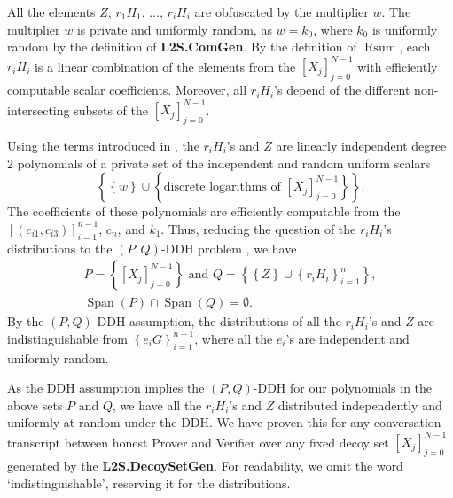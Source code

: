 \documentclass{mathcryptology} %
\DeclareMathOperator{\Rsum}{Rsum}
\DeclareMathOperator{\Span}{Span}
\theoremstyle{title}
\theoremstyle{titleof}
\begin{document}
    All the elements $Z$, $r_{1}H_{1}$, $\dots$, $r_{i}H_{i}$ are obfuscated by the multiplier $w$. The multiplier $w$ is private and uniformly random, as $w=k_{0}$, where $k_{0}$ is uniformly random by the definition of \textbf{L2S.ComGen}. By the definition of $\Rsum$, each $r_{i}H_{i}$ is a linear combination of the elements from the ${\left[X_{j}\right]}_{j=0}^{N-1}$ with efficiently computable scalar coefficients. Moreover, all $r_{i}H_{i}$'s depend of the different non-intersecting subsets of the ${\left[X_{j}\right]}_{j=0}^{N-1}$.

    Using the terms introduced in \cite{4}, the $r_{i}H_{i}$'s and $Z$ are linearly independent degree 2 polynomials of a private set of the independent and random uniform scalars
    \begin{equation*}
        \left\{\left\{w\right\} \cup \left\{\text{discrete logarithms of ${\left[X_{j}\right]}_{j=0}^{N-1}$} \right\}\right\}.
    \end{equation*}
    The coefficients of these polynomials are efficiently computable from the ${\left[\left(c_{i1}, c_{i3}\right)\right]}_{i=1}^{n-1}$, $c_{n}$, and $k_{1}$. Thus, reducing the question of the $r_{i}H_{i}$'s distributions to the $\left(P,Q\right)$-DDH problem \cite{4}, we have
    \begin{gather*}
        P = \left\{ {\left[X_{j}\right]}_{j=0}^{N-1} \right\} \text{ and }
        Q = \left\{\left\{Z\right\} \cup {\left\{r_{i}H_{i}\right\}}_{i=1}^n \right\},\\
        \Span\left(P\right) \cap \Span\left(Q\right)= \emptyset.
    \end{gather*}
    By the $\left(P,Q\right)$-DDH assumption, the distributions of all the $r_{i}H_{i}$'s and $Z$ are indistinguishable from ${\left\{e_{i} G\right\}}_{i=1}^{n+1}$, where all the $e_{i}$'s are independent and uniformly random.

    As the DDH assumption implies the $\left(P,Q\right)$-DDH \cite{4} for our polynomials in the above sets $P$ and $Q$, we have all the $r_{i}H_{i}$'s and $Z$ distributed independently and uniformly at random under the DDH. We have proven this for any conversation transcript between honest Prover and Verifier over any fixed decoy set ${\left[X_{j}\right]}_{j=0}^{N-1}$ generated by the \textbf{L2S.DecoySetGen}. For readability, we omit the word `indistinguishable', reserving it for the distributions.
\end{document}
